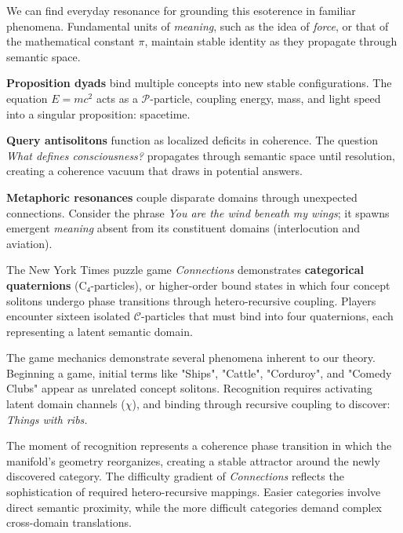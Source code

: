 We can find everyday resonance for grounding this esoterence in familiar phenomena. Fundamental units of \textit{meaning}, such as the idea of \textit{force}, or that of the mathematical constant \(\pi\), maintain stable identity as they propagate through semantic space.

\textbf{Proposition dyads} bind multiple concepts into new stable configurations. The equation \(E = mc^2\) acts as a \(\mathcal{P}\)-particle, coupling energy, mass, and light speed into a singular proposition: spacetime.

\textbf{Query antisolitons} function as localized deficits in coherence. The question \textit{What defines consciousness?} propagates through semantic space until resolution, creating a coherence vacuum that draws in potential answers.

\textbf{Metaphoric resonances} couple disparate domains through unexpected connections. Consider the phrase \textit{You are the wind beneath my wings}; it spawns emergent \textit{meaning} absent from its constituent domains (interlocution and aviation).


The New York Times puzzle game \textit{Connections} demonstrates \textbf{categorical quaternions} (C₄-particles), or higher-order bound states in which four concept solitons undergo phase transitions through hetero-recursive coupling. Players encounter sixteen isolated \(\mathcal{C}\)-particles that must bind into four quaternions, each representing a latent semantic domain.

The game mechanics demonstrate several phenomena inherent to our theory. Beginning a game, initial terms like "Ships", "Cattle", "Corduroy", and "Comedy Clubs" appear as unrelated concept solitons. Recognition requires activating latent domain channels (\(\chi\)), and binding through recursive coupling to discover: \textit{Things with ribs.} 

The moment of recognition represents a coherence phase transition in which the manifold's geometry reorganizes, creating a stable attractor around the newly discovered category. The difficulty gradient of \textit{Connections} reflects the sophistication of required hetero-recursive mappings. Easier categories involve direct semantic proximity, while the more difficult categories demand complex cross-domain translations.


